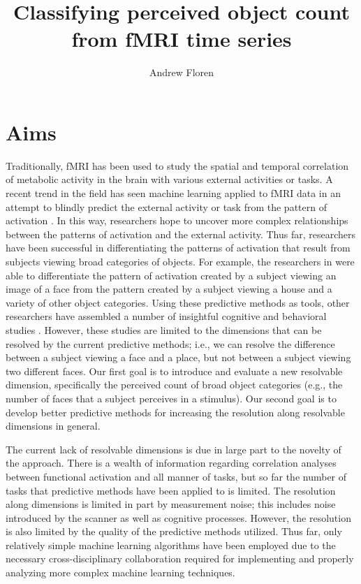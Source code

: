 \documentclass[12pt]{article}
\title{Classifying perceived object count from fMRI time series}
\author{Andrew Floren}
\date{}
\begin{document}
\maketitle{}

\section{Aims}
Traditionally, fMRI has been used to study the spatial and temporal correlation of metabolic activity in the brain with various external activities or tasks.
A recent trend in the field has seen machine learning applied to fMRI data in an attempt to blindly predict the external activity or task from the pattern of activation \cite{Haxby2001,Mitchell2003,Haynes2006}.
In this way, researchers hope to uncover more complex relationships between the patterns of activation and the external activity.
Thus far, researchers have been successful in differentiating the patterns of activation that result from subjects viewing broad categories of objects.
For example, the researchers in \cite{Haxby2001} were able to differentiate the pattern of activation created by a subject viewing an image of a face from the pattern created by a subject viewing a house and a variety of other object categories.
Using these predictive methods as tools, other researchers have assembled a number of insightful cognitive and behavioral studies \cite{Lewis-Peacock2012,Davatzikos2005}.
However, these studies are limited to the dimensions that can be resolved by the current predictive methods; i.e., we can resolve the difference between a subject viewing a face and a place, but not between a subject viewing two different faces.
Our first goal is to introduce and evaluate a new resolvable dimension, specifically the perceived count of broad object categories (e.g., the number of faces that a subject perceives in a stimulus).
Our second goal is to develop better predictive methods for increasing the resolution along resolvable dimensions in general.

The current lack of resolvable dimensions is due in large part to the novelty of the approach.
There is a wealth of information regarding correlation analyses between functional activation and all manner of tasks, but so far the number of tasks that predictive methods have been applied to is limited.
The resolution along dimensions is limited in part by measurement noise; this includes noise introduced by the scanner as well as cognitive processes.
However, the resolution is also limited by the quality of the predictive methods utilized.
Thus far, only relatively simple machine learning algorithms have been employed due to the necessary cross-disciplinary collaboration required for implementing and properly analyzing more complex machine learning techniques.
\end{document}
